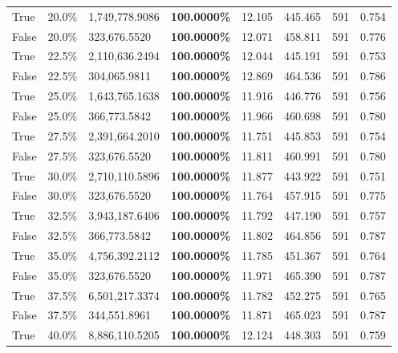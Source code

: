 \begin{table}[H]
\begin{tabular}{lllrllll}
\cline{1-8}
True & 20.0\% & 1,749,778.9086 & \bfseries \color{red} 100.0000\% & 12.105 & 445.465 & 591 & 0.754 \\
\cline{1-8}
False & 20.0\% & 323,676.5520 & \bfseries \color{red} 100.0000\% & 12.071 & 458.811 & 591 & 0.776 \\
\cline{1-8}
True & 22.5\% & 2,110,636.2494 & \bfseries \color{red} 100.0000\% & 12.044 & 445.191 & 591 & 0.753 \\
\cline{1-8}
False & 22.5\% & 304,065.9811 & \bfseries \color{red} 100.0000\% & 12.869 & 464.536 & 591 & 0.786 \\
\cline{1-8}
True & 25.0\% & 1,643,765.1638 & \bfseries \color{red} 100.0000\% & 11.916 & 446.776 & 591 & 0.756 \\
\cline{1-8}
False & 25.0\% & 366,773.5842 & \bfseries \color{red} 100.0000\% & 11.966 & 460.698 & 591 & 0.780 \\
\cline{1-8}
True & 27.5\% & 2,391,664.2010 & \bfseries \color{red} 100.0000\% & 11.751 & 445.853 & 591 & 0.754 \\
\cline{1-8}
False & 27.5\% & 323,676.5520 & \bfseries \color{red} 100.0000\% & 11.811 & 460.991 & 591 & 0.780 \\
\cline{1-8}
True & 30.0\% & 2,710,110.5896 & \bfseries \color{red} 100.0000\% & 11.877 & 443.922 & 591 & 0.751 \\
\cline{1-8}
False & 30.0\% & 323,676.5520 & \bfseries \color{red} 100.0000\% & 11.764 & 457.915 & 591 & 0.775 \\
\cline{1-8}
True & 32.5\% & 3,943,187.6406 & \bfseries \color{red} 100.0000\% & 11.792 & 447.190 & 591 & 0.757 \\
\cline{1-8}
False & 32.5\% & 366,773.5842 & \bfseries \color{red} 100.0000\% & 11.802 & 464.856 & 591 & 0.787 \\
\cline{1-8}
True & 35.0\% & 4,756,392.2112 & \bfseries \color{red} 100.0000\% & 11.785 & 451.367 & 591 & 0.764 \\
\cline{1-8}
False & 35.0\% & 323,676.5520 & \bfseries \color{red} 100.0000\% & 11.971 & 465.390 & 591 & 0.787 \\
\cline{1-8}
True & 37.5\% & 6,501,217.3374 & \bfseries \color{red} 100.0000\% & 11.782 & 452.275 & 591 & 0.765 \\
\cline{1-8}
False & 37.5\% & 344,551.8961 & \bfseries \color{red} 100.0000\% & 11.871 & 465.023 & 591 & 0.787 \\
\cline{1-8}
True & 40.0\% & 8,886,110.5205 & \bfseries \color{red} 100.0000\% & 12.124 & 448.303 & 591 & 0.759 \\

\end{tabular}
\end{table}
